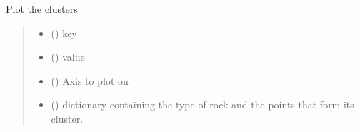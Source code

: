 \documentclass[letterpaper,10pt,english]{sphinxmanual}
\begin{document}
\begin{fulllineitems}
\begin{fulllineitems}
\label{\detokenize{pyrockmodulus:pyrockmodulus.pyrockmodulus.modulus_ratio.plot_clusters}}
\pysigstartsignatures
{}
\pysigstopsignatures
\sphinxAtStartPar
Plot the clusters
\begin{quote}\begin{description}
\begin{itemize}
\item {} 
\sphinxAtStartPar
{} () \textendash{} key

\item {} 
\sphinxAtStartPar
{} () \textendash{} value

\item {} 
\sphinxAtStartPar
{} () \textendash{} Axis to plot on

\item {} 
\sphinxAtStartPar
{} () \textendash{} dictionary containing the type of rock and the points that form its cluster.

\end{itemize}

\sphinxAtStartPar


\sphinxAtStartPar


\end{description}\end{quote}

\end{fulllineitems}



\end{fulllineitems}
\end{document}
